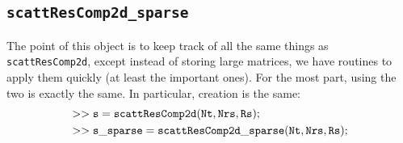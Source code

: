 \subsection{{\tt scattResComp2d\_sparse}}
\label{sec-scattResComp2d_sparse}

The point of this object is to keep track of all the same
things as {\tt scattResComp2d}, except instead of storing 
large matrices, we have
routines to apply them quickly (at least the important ones).
For the most part, using the two is exactly the same. In particular,
creation is the same:
\begin{equation}
\begin{aligned}
 &{\tt >> s = scattResComp2d(Nt,Nrs,Rs);} \\ 
 &{\tt >> s\_sparse = scattResComp2d\_sparse(Nt,Nrs,Rs);}
\end{aligned}
\end{equation}

